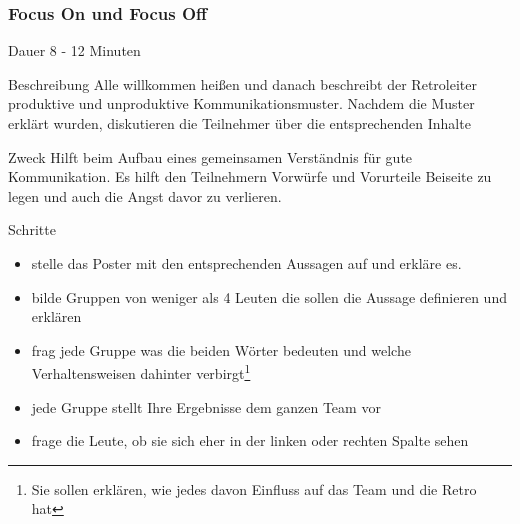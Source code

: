 \subsubsection{Focus On und Focus Off}
\begin{Beschreibungfett}[Beschreibung]
  \item [Dauer] 8 - 12 Minuten
  \item [Beschreibung] Alle willkommen heißen und danach beschreibt der Retroleiter
  produktive und unproduktive Kommunikationsmuster. Nachdem die Muster erklärt wurden,
  diskutieren die Teilnehmer über die entsprechenden Inhalte
\item [Zweck] Hilft beim Aufbau eines gemeinsamen Verständnis für gute Kommunikation. Es
  hilft den Teilnehmern Vorwürfe und Vorurteile Beiseite zu legen und auch die Angst davor zu
  verlieren.
  \item [Schritte]
    \begin{itemize}
      \item stelle das Poster mit den entsprechenden Aussagen auf und erkläre es.
      \item bilde Gruppen von weniger als 4 Leuten die sollen die Aussage definieren und erklären
      \item frag jede Gruppe was die beiden Wörter bedeuten und welche Verhaltensweisen dahinter
        verbirgt\footnote{Sie sollen erklären, wie jedes davon Einfluss auf das Team und die Retro
          hat}
      \item jede Gruppe stellt Ihre Ergebnisse dem ganzen Team vor
      \item frage die Leute, ob sie sich eher in der linken oder rechten Spalte sehen
    \end{itemize}
\end{Beschreibungfett}


